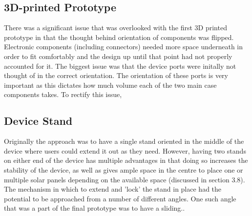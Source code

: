 \subsection{3D-printed Prototype}

There was a significant issue that was overlooked with the first 3D printed prototype in that the thought behind orientation of components was flipped.
Electronic components (including connectors) needed more space underneath in order to fit comfortably and the design up until that point had not properly accounted for it.
The biggest issue was that the device ports were initally not thought of in the correct orientation.
The orientation of these ports is very important as this dictates how much volume each of the two main case components takes.
To rectify this issue, 


\subsection{Device Stand}

Originally the approach was to have a single stand oriented in the middle of the device where users could extend it out as they need.
However, having two stands on either end of the device has multiple advantages in that doing so increases the stability of the device, as well as gives ample space in the centre to place one or multiple solar panels depending on the available space (discussed in section 3.8).
The mechanism in which to extend and 'lock' the stand in place had the potential to be approached from a number of different angles.
One such angle that was a part of the final prototype was to have a sliding..

